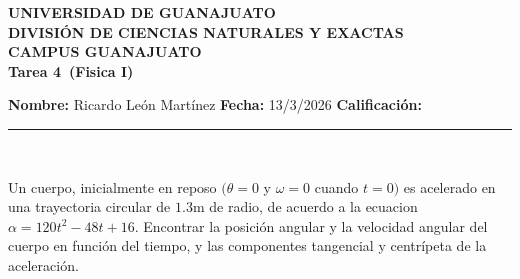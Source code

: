\documentclass[12pt,a4paper]{article}
\newcommand{\alumno}{Ricardo León Martínez}
\newcommand{\materia}{Fisica I}
\newcommand{\tarea}{Tarea 4}
\newcommand{\fecha}{13/3/2026}
\begin{document}
    \begin{center}
    {\large\textbf{UNIVERSIDAD DE GUANAJUATO}}\\[0.3cm]
    {\normalsize\textbf{DIVISIÓN DE CIENCIAS NATURALES Y EXACTAS}}\\
    {\normalsize\textbf{CAMPUS GUANAJUATO}}\\[1cm]

    {\Large\textbf{\tarea\ (\materia)}}\\[1cm]
    \end{center}

    \textbf{Nombre:} \alumno \hfill 
    \textbf{Fecha:} \fecha \hfill 
    \textbf{Calificación:} \rule{3cm}{0.4pt} \\[0.3cm]

    \begin{mdframed}[style=mdbluebox,frametitle={Ejercicio 1}]
        Un cuerpo, inicialmente en reposo $(\theta=0$ y $\omega=0$ cuando $t=0)$ es
        acelerado en una trayectoria circular de $1.3$m de radio, de acuerdo a la ecuacion
        $\alpha=120t^{2}-48t+16$. Encontrar la posición angular y la velocidad angular del
        cuerpo en función del tiempo, y las componentes tangencial y centrípeta de la
        aceleración.
    \end{mdframed}
\end{document}
